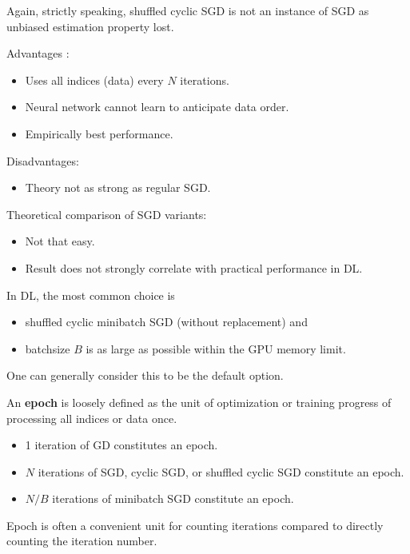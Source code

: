 \documentclass{report}
\begin{document}
\begin{concept}
    Again, strictly speaking, shuffled cyclic SGD is not an instance of SGD as unbiased estimation property lost.

    Advantages :

    \begin{itemize}
        \item Uses all indices (data) every $N$ iterations.
        \item Neural network cannot learn to anticipate data order.
        \item Empirically best performance.
    \end{itemize}

    Disadvantages:

    \begin{itemize}
        \item Theory not as strong as regular SGD.
    \end{itemize}
\end{concept}

\begin{concept}
    Theoretical comparison of SGD variants:

    \begin{itemize}
        \item Not that easy.
        \item Result does not strongly correlate with practical performance in DL.
    \end{itemize}

    In DL, the most common choice is

    \begin{itemize}
        \item shuffled cyclic minibatch SGD (without replacement) and
        \item batchsize $B$ is as large as possible within the GPU memory limit.
    \end{itemize}

    One can generally consider this to be the default option.
\end{concept}

\begin{definition}
    An \textbf{epoch} is loosely defined as the unit of optimization or training progress of processing all indices or data once.

    \begin{itemize}
        \item 1 iteration of GD constitutes an epoch.
        \item $N$ iterations of SGD, cyclic SGD, or shuffled cyclic SGD constitute an epoch.
        \item $N / B$ iterations of minibatch SGD constitute an epoch.
    \end{itemize}

    Epoch is often a convenient unit for counting iterations compared to directly counting the iteration number.
\end{definition}
\end{document}
